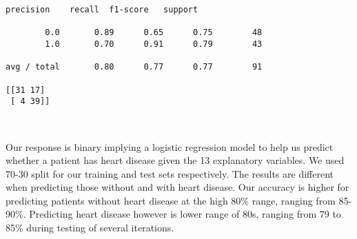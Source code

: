 \documentclass[11pt]{article}
\begin{document}
    \begin{Verbatim}[commandchars=\\\{\}]
             precision    recall  f1-score   support

        0.0       0.89      0.65      0.75        48
        1.0       0.70      0.91      0.79        43

avg / total       0.80      0.77      0.77        91

[[31 17]
 [ 4 39]]

    \end{Verbatim}

    \begin{center}
    \end{center}
    { \hspace*{\fill} \\}
    
    Our response is binary implying a logistic regression model to help us
predict whether a patient has heart disease given the 13 explanatory
variables. We used 70-30 split for our training and test sets
respectively. The results are different when predicting those without
and with heart disease. Our accuracy is higher for predicting patients
without heart disease at the high 80\% range, ranging from 85-90\%.
Predicting heart disease however is lower range of 80s, ranging from 79
to 85\% during testing of several iterations.


    
    
    
    
\end{document}
